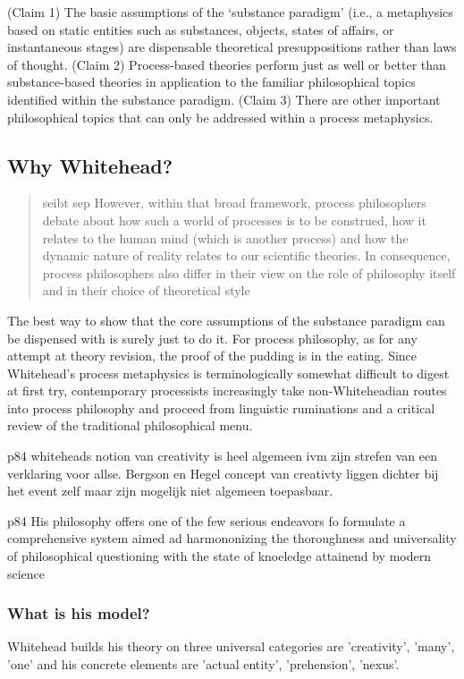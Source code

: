 (Claim 1) The basic assumptions of the ‘substance paradigm’ (i.e., a metaphysics based on static entities such as substances, objects, states of affairs, or instantaneous stages) are dispensable theoretical presuppositions rather than laws of thought.
(Claim 2) Process-based theories perform just as well or better than substance-based theories in application to the familiar philosophical topics identified within the substance paradigm.
(Claim 3) There are other important philosophical topics that can only be addressed within a process metaphysics.

\subsection{Why Whitehead?}
\begin{quotation}
	seibt sep
	However, within that broad framework, process philosophers debate about how such a world of processes is to be construed, how it relates to the human mind (which is another process) and how the dynamic nature of reality relates to our scientific theories. In consequence, process philosophers also differ in their view on the role of philosophy itself and in their choice of theoretical style
	
\end{quotation}

The best way to show that the core assumptions of the substance paradigm can be dispensed with is surely just to do it. For process philosophy, as for any attempt at theory revision, the proof of the pudding is in the eating. Since Whitehead's process metaphysics is terminologically somewhat difficult to digest at first try, contemporary processists increasingly take non-Whiteheadian routes into process philosophy and proceed from linguistic ruminations and a critical review of
the traditional philosophical menu.

p84 
whiteheads notion van creativity is heel algemeen ivm zijn strefen van een verklaring voor allse. Bergson en Hegel concept van creativty liggen dichter bij het event zelf maar zijn mogelijk niet algemeen toepasbaar.

p84
His philosophy offers one of the few serious endeavors fo formulate a comprehensive  system aimed ad harmononizing the thoroughness and universality of philosophical questioning with the state of knoeledge attainend by modern science \cite[p84]{rapp1990whitehead}

\subsubsection{What is his model?}
\cite{whitehead1929process}
Whitehead builds his theory on three universal categories are 'creativity', 'many', 'one' and his concrete elements are 'actual entity', 'prehension', 'nexus'.


